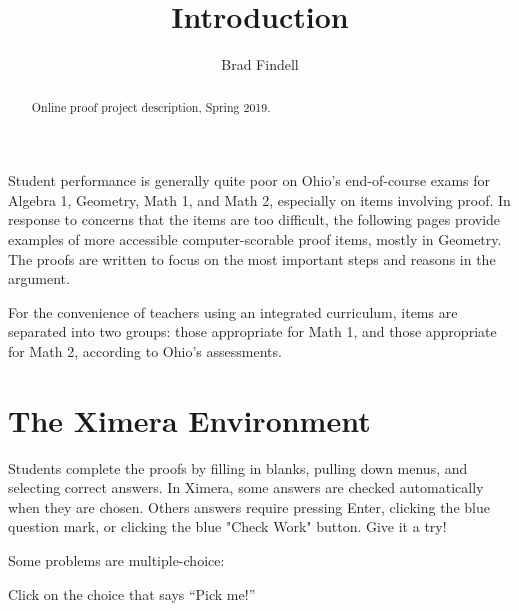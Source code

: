 \documentclass[nooutcomes]{ximera}
\title{Introduction}
\author{Brad Findell}
\begin{document}
\begin{abstract}
Online proof project description, Spring 2019.
\end{abstract}
\maketitle

Student performance is generally quite poor on Ohio's end-of-course exams for Algebra 1, Geometry, Math 1, and Math 2, especially on items involving proof.  In response to concerns that the items are too difficult, the following pages provide examples of more accessible computer-scorable proof items, mostly in Geometry.  The proofs are written to focus on the most important steps and reasons in the argument.

For the convenience of teachers using an integrated curriculum, items are separated into two groups: those appropriate for Math 1, and those appropriate for Math 2, according to Ohio's assessments.  



\section{The Ximera Environment}
Students complete the proofs by filling in blanks, pulling down menus, and selecting correct answers.  
In Ximera, some answers are checked automatically when they are chosen.  Others answers require pressing Enter, clicking the blue question mark, or clicking the blue "Check Work" button. Give it a try!  

\begin{example}
  Some problems are multiple-choice:
  \begin{multipleChoice}
  \end{multipleChoice}
  \begin{feedback}
    Click on the choice that says ``Pick me!''
  \end{feedback}
\end{example}
\end{document}
